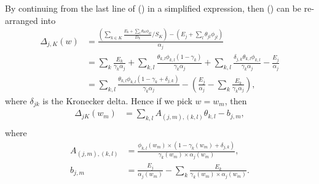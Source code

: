 \documentclass[12pt]{article}
\def\D{\displaystyle}
\begin{document}
By continuing from the last line of () in a simplified expression, then () can be re-arranged into
\begin{equation}
    \label{eq:delta_split}
    \begin{split}
        \Delta_{j,K}(w)&= \frac{\D \left(\sum_{k\in K} \frac{E_k + \sum_l \theta_{kl} \phi_{kl}}{D_k} / S_K\right) - \left(E_j + \sum_l \theta_{jl} \phi_{jl}\right)}{\alpha_j} \\
        &= \sum_k \frac{E_k}{\gamma_k\alpha_j} + \sum_{k,l} \frac{\theta_{k,l} \phi_{k,l} (1-\gamma_k)}{\gamma_k\alpha_j} +  \sum_{k,l} \frac{\delta_{j,k}\theta_{k,l} \phi_{k,l}}{\gamma_k\alpha_j} - \frac{E_j}{\alpha_j}\\
        &= \sum_{k,l} \frac{\theta_{k,l} \phi_{k,l} (1-\gamma_k + \delta_{j,k})}{\gamma_k\alpha_j} - \left(\frac{E_j}{\alpha_j} - \sum_k\frac{E_k}{\gamma_k\alpha_j}\right),
    \end{split}
\end{equation}
where $\delta_{jk}$ is the Kronecker delta. Hence if we pick $w = w_m$, then
\begin{equation}
	\begin{split}
		\Delta_{jK}(w_m) &= \sum_{k,l} A_{(j,m), (k,l)} \theta_{k,l} - b_{j,m}, \\
	\end{split}	
\end{equation}
where
\begin{equation}
	\begin{split}
		A_{(j,m), (k,l)} &= \frac{\phi_{k,l}(w_m)\times(1 - \gamma_k(w_m) + \delta_{j,k})}{\gamma_k(w_m) \times\alpha_j(w_m)},\\
		b_{j,m} &= \frac{E_j}{\alpha_j(w_m)} - \sum_k\frac{E_k}{\gamma_k(w_m) \times \alpha_j(w_m)}.
	\end{split}
\end{equation}
\end{document}

